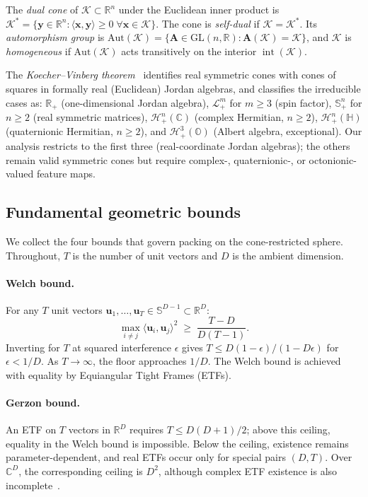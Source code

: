 \documentclass{article}
\newcommand{\1}{\bm{1}}
\newcommand{\lrangle}[1]{\langle#1\rangle}
\def\eps{{\epsilon}}
\def\vu{{\bm{u}}}
\def\vx{{\bm{x}}}
\def\vy{{\bm{y}}}
\def\mA{{\bm{A}}}
\def\gH{{\mathcal{H}}}
\def\gK{{\mathcal{K}}}
\def\gL{{\mathcal{L}}}
\def\sS{{\mathbb{S}}}
\newcommand{\R}{\mathbb{R}}
\newcommand{\seql}{T}
\theoremstyle{definition}
\begin{document}
The \emph{dual cone} of $\gK\subset\R^n$ under the Euclidean inner product is $\gK^* = \{\vy\in\R^n
  : \lrangle{\vx,\vy}\ge 0\;\forall\vx\in\gK\}$. The cone is \emph{self-dual} if $\gK = \gK^*$. Its
\emph{automorphism group} is $\mathrm{Aut}(\gK) = \{\mA\in\mathrm{GL}(n,\R) : \mA(\gK) = \gK\}$,
and $\gK$ is \emph{homogeneous} if $\mathrm{Aut}(\gK)$ acts transitively on the interior
$\operatorname{int}(\gK)$.

The \emph{Koecher--Vinberg
  theorem}~\citep{koecher57positivitatsbereiche,vinberg63homogeneous,faraut94analysis} identifies
real symmetric cones with cones of squares in formally real (Euclidean) Jordan algebras, and
classifies the irreducible cases as: $\R_+$ (one-dimensional Jordan algebra), $\gL^m_+$ for $m\ge
  3$ (spin factor), $\sS^n_+$ for $n\ge 2$ (real symmetric matrices), $\gH^n_+(\mathbb{C})$ (complex
Hermitian, $n\ge 2$), $\gH^n_+(\mathbb{H})$ (quaternionic Hermitian, $n\ge 2$), and
$\gH^3_+(\mathbb{O})$ (Albert algebra, exceptional). Our analysis restricts to the first three
(real-coordinate Jordan algebras); the others remain valid symmetric cones but require complex-,
quaternionic-, or octonionic-valued feature maps.

\subsection{Fundamental geometric bounds}
\label{app:geom-bounds}

We collect the four bounds that govern packing on the cone-restricted sphere. Throughout, $\seql$ is
the number of unit vectors and $D$ is the ambient dimension.

\paragraph{Welch bound.} For any $\seql$ unit vectors $\vu_1,\dots,\vu_{\seql}\in\mathbb{S}^{D-1}\subset\R^D$:
\[
  \max_{i\neq j} \lrangle{\vu_i,\vu_j}^2 \;\ge\; \frac{\seql-D}{D(\seql-1)}.
\]
Inverting for $\seql$ at squared interference $\eps$ gives $\seql \le D(1-\eps)/(1-D\eps)$ for $\eps<1/D$.
As $\seql\to\infty$, the floor approaches $1/D$. The Welch bound is achieved with equality by
Equiangular Tight Frames (ETFs).

\paragraph{Gerzon bound.} An ETF on $\seql$ vectors in $\R^D$ requires
$\seql\le D(D+1)/2$; above this ceiling, equality in the Welch bound is impossible. Below the ceiling,
existence remains parameter-dependent, and real ETFs occur only for special pairs $(D,\seql)$. Over
$\mathbb C^D$, the corresponding ceiling is $D^2$, although complex ETF existence is also
incomplete~\citep{fickus16etf}.
\end{document}
